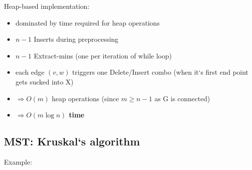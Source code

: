 \documentclass[a4paper,12pt]{article}
\theoremstyle{plain}
\theoremstyle{definition}
\theoremstyle{remark}
\begin{document}
Heap-based implementation:
\begin{itemize}
	\item dominated by time required for heap operations
	\item $n-1$ Inserts during preprocessing
	\item $n-1$ Extract-mins (one per iteration of while loop)
	\item each edge $(v,w)$ triggers one Delete/Insert combo (when it`s first end point gets sucked into X)
	\item $\Rightarrow O(m)$ heap operations (since $m \geq n-1$ as G is connected)
	\item \textbf{$\Rightarrow O(m \log n)$ time}
\end{itemize}



\subsection{MST: Kruskal`s algorithm}
Example:
\end{document}
